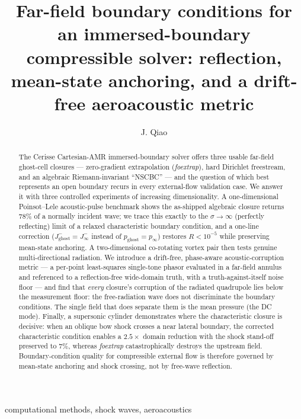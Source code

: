 \documentclass{jfm}
\title{Far-field boundary conditions for an immersed-boundary
compressible solver: reflection, mean-state anchoring, and a
drift-free aeroacoustic metric}
\author{J. Qiao\aff{1}
  \corresp{\email{qiaojiaye970122@gmail.com}}}
\affiliation{\aff{1}Cerisse compressible immersed-boundary solver,
validation campaign}
\newcommand{\pinf}{p_\infty}
\begin{document}
\maketitle

\begin{abstract}
The Cerisse Cartesian-AMR immersed-boundary solver offers three usable
far-field ghost-cell closures --- zero-gradient extrapolation
(\textit{foextrap}), hard Dirichlet freestream, and an algebraic
Riemann-invariant ``NSCBC'' --- and the question of which best represents an
open boundary recurs in every external-flow validation case. We answer it with
three controlled experiments of increasing dimensionality. A one-dimensional
Poinsot--Lele acoustic-pulse benchmark shows the as-shipped algebraic closure
returns $78\%$ of a normally incident wave; we trace this exactly to the
$\sigma\!\to\!\infty$ (perfectly reflecting) limit of a relaxed
characteristic boundary condition, and a one-line correction
($J^-_{\mathrm{ghost}}=J^-_\infty$ instead of $p_{\mathrm{ghost}}=\pinf$)
restores $R<10^{-5}$ while preserving mean-state anchoring. A two-dimensional
co-rotating vortex pair then tests genuine multi-directional radiation. We
introduce a drift-free, phase-aware acoustic-corruption metric --- a per-point
least-squares single-tone phasor evaluated in a far-field annulus and
referenced to a reflection-free wide-domain truth, with a
truth-against-itself noise floor --- and find that \textit{every} closure's
corruption of the radiated quadrupole lies below the measurement floor: the
free-radiation wave does not discriminate the boundary conditions. The single
field that does separate them is the mean pressure (the DC mode). Finally, a
supersonic cylinder demonstrates where the characteristic closure is decisive:
when an oblique bow shock crosses a near lateral boundary, the corrected
characteristic condition enables a $2.5\times$ domain reduction with the shock
stand-off preserved to $7\%$, whereas \textit{foextrap} catastrophically
destroys the upstream field. Boundary-condition quality for compressible
external flow is therefore governed by mean-state anchoring and shock crossing,
not by free-wave reflection.
\end{abstract}

\begin{keywords}
computational methods, shock waves, aeroacoustics
\end{keywords}
\end{document}
